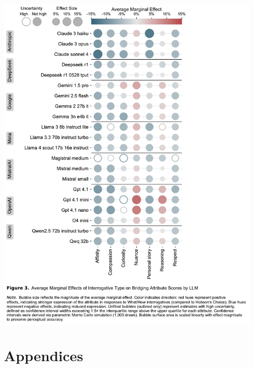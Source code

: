 \documentclass[
  12pt,
]{article}
\begin{document}
\includegraphics{../03_outputs/03_experimental_analyses/figure_3.pdf}

\section{Appendices}\label{appendices}
\end{document}
